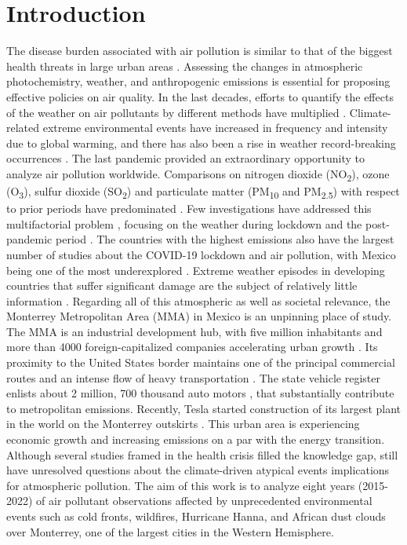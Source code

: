 \documentclass[sn-mathphys-num]{sn-jnl}
\begin{document}
\section{Introduction}
The disease burden associated with air pollution is similar to that of the biggest health threats in large urban areas \citep{organization2021}. Assessing the changes in atmospheric photochemistry, weather, and anthropogenic emissions is essential for proposing effective policies on air quality. In the last decades, efforts to quantify the effects of the weather on air pollutants by different methods have multiplied \citep{Zhang_2017,Shrestha_2022,Gong_2022,Ni_2023}. Climate-related extreme environmental events have increased in frequency and intensity due to global warming, and there has also been a rise in weather record-breaking occurrences \citep{Ni_2023,Clarke_2022,Swain_2020}. The last pandemic provided an extraordinary opportunity to analyze air pollution worldwide. Comparisons on nitrogen dioxide (NO\textsubscript{2}), ozone (O\textsubscript{3}), sulfur dioxide (SO\textsubscript{2}) and particulate matter (PM\textsubscript{10} and PM\textsubscript{2.5}) with respect to prior periods have predominated \citep{Kumari_2020,Bao2020,Berman_2020,Saha_2022,Han_2022}. Few investigations have addressed this multifactorial problem \citep{Sokhi2021,Bontempi_2022}, focusing on the weather during lockdown and the post-pandemic period \citep{Hernandez-Paniagua2021,ZORAN,Priya,Agrawal_2024}. The countries with the highest emissions also have the largest number of studies about the COVID-19 lockdown and air pollution, with Mexico being one of the most underexplored \citep{Aboagye}. Extreme weather episodes in developing countries that suffer significant damage are the subject of relatively little information \citep{Otto_2020}. Regarding all of this atmospheric as well as societal relevance, the Monterrey Metropolitan Area (MMA) in Mexico is an unpinning place of study. The MMA is an industrial development hub, with five million inhabitants and more than 4000 foreign-capitalized companies accelerating urban growth \citep{20152018}. Its proximity to the United States border maintains one of the principal commercial routes and an intense flow of heavy transportation \citep{cmm2019}. The state vehicle register enlists about 2 million, 700 thousand auto motors \citep{len}, that substantially contribute to metropolitan emissions. Recently, Tesla started construction of its largest plant in the world on the Monterrey outskirts \citep{tesla_2023}. This urban area is experiencing economic growth and increasing emissions on a par with the energy transition. Although several studies framed in the health crisis filled the knowledge gap, still have unresolved questions about the climate-driven atypical events implications for atmospheric pollution. The aim of this work is to analyze eight years (2015-2022) of air pollutant observations affected by unprecedented environmental events such as cold fronts, wildfires, Hurricane Hanna, and African dust clouds over Monterrey, one of the largest cities in the Western Hemisphere.
\end{document}
